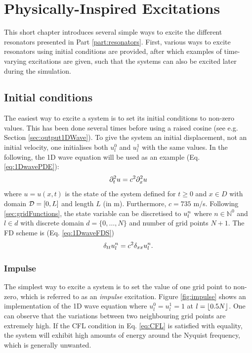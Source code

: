 \chapter{Physically-Inspired Excitations}\label{ch:physInspExcitations}
This short chapter introduces several simple ways to excite the different resonators presented in Part \ref{part:resonators}. First, various ways to excite resonators using initial conditions are provided, after which examples of time-varying excitations are given, such that the systems can also be excited later during the simulation.

\section{Initial conditions}\label{sec:initConditionsPhysInsp}
The easiest way to excite a system is to set its initial conditions to non-zero values. This has been done several times before using a raised cosine (see e.g. Section \ref{sec:output1DWave}). To give the system an initial displacement, not an initial velocity, one initialises both $u^0_l$ and $u^1_l$ with the same values. In the following, the 1D wave equation will be used as an example (Eq. \eqref{eq:1DwavePDE}):
\begin{equation}
    \partial_t^2 u = c^2 \partial_x^2 u
\end{equation}
where $u=u(x,t)$ is the state of the system defined for $t\geq 0$ and $x\in D$ with domain $\mathcal{D} = [0, L]$ and length $L$ (in m). Furthermore, $c = 735$ m/s. Following \ref{sec:gridFunctions}, the state variable can be discretised to $u_l^n$ where $n\in \mathbb{N}^0$ and $l\in d$ with discrete domain $d = \{0, \hdots, N\}$ and number of grid points $N+1$. The FD scheme is (Eq. \eqref{eq:1DwaveFDS})
\begin{equation}
    \delta_{tt} u_l^n = c^2 \delta_{xx} u_l^n.
\end{equation}

\subsection{Impulse}
The simplest way to excite a system is to set the value of one grid point to non-zero, which is referred to as an \textit{impulse} excitation. Figure \ref{fig:impulse} shows an implementation of the 1D wave equation where $u_l^0 = u_l^1 = 1$ at $l = \floor[0.5 N]$. One can observe that the variations between two neighbouring grid points are extremely high. If the CFL condition in Eq. \eqref{eq:CFL} is satisfied with equality, the system will exhibit high amounts of energy around the Nyquist frequency, which is generally unwanted.

